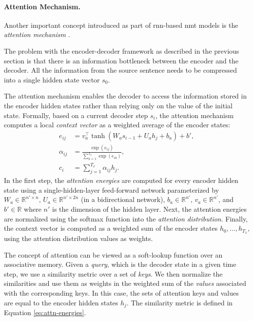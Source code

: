 \paragraph{Attention Mechanism.} Another important concept introduced as part
of \ac{rnn}-based \ac{nmt} models is the \emph{attention mechanism}
\citep{bahdanau2014neural,luong-etal-2015-effective}.

The problem with the encoder-decoder framework as described in the previous
section is that there is an information bottleneck between the encoder and the
decoder. All the information from the source sentence needs to be compressed
into a single hidden state vector $s_0$.

The attention mechanism enables the decoder to access the information stored in
the encoder hidden states rather than relying only on the value of the initial
state.  Formally, based on a current decoder step $s_i$, the attention mechanism
computes a local \emph{context vector} as a weighted average of the encoder
states:
%
\begin{align}
  e_{ij} &= v_a^\top \tanh (W_a s_{i-1} + U_a h_j + b_a) + b', \label{eq:attn-energies} \\
  \alpha_{ij} &= \frac{\exp(e_{ij})}{\sum_{k=1}^{T_x}\exp(e_{ik})}, \\
  c_i &= \sum_{j=1}^{T_x} \alpha_{ij} h_j.
\end{align}
%
In the first step, the \emph{attention energies} are computed for every encoder
hidden state using a single-hidden-layer feed-forward network parameterized by
$W_a \in \mathbb{R}^{n' \times n}$, $U_a \in \mathbb{R}^{n' \times 2n}$ (in a
bidirectional network), $b_a \in \mathbb{R}^{n'}$, $v_a \in \mathbb{R}^{n'}$,
and $b' \in \mathbb{R}$ where $n'$ is the dimension of the hidden layer. Next,
the attention energies are normalized using the softmax function into the
\emph{attention distribution}.  Finally, the context vector is computed as a
weighted sum of the encoder states $h_0,\ldots, h_{T_x}$, using the attention
distribution values as weights.

The concept of attention can be viewed as a soft-lookup function over an
associative memory. Given a \emph{query}, which is the decoder state in a given
time step, we use a similarity metric over a set of \emph{keys}. We then
normalize the similarities and use them as weights in the weighted sum of the
\emph{values} associated with the corresponding keys. In this case, the sets of
attention keys and values are equal to the encoder hidden states $h_j$. The
similarity metric is defined in Equation \ref{eq:attn-energies}.


